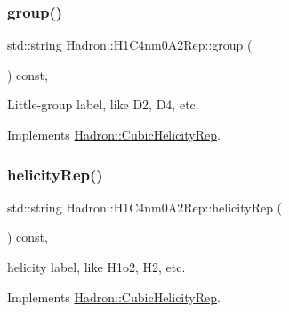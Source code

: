 \mbox{\label{structHadron_1_1H1C4nm0A2Rep_a3033103082fad0b1572469c929fde9bb}} 
\subsubsection{\texorpdfstring{group()}{group()}\hspace{0.1cm}{\footnotesize\ttfamily [5/5]}}
{\footnotesize\ttfamily std\+::string Hadron\+::\+H1\+C4nm0\+A2\+Rep\+::group (\begin{DoxyParamCaption}{ }\end{DoxyParamCaption}) const\hspace{0.3cm}{\ttfamily [inline]}, {\ttfamily [virtual]}}

Little-\/group label, like D2, D4, etc. 

Implements \mbox{\hyperlink{structHadron_1_1CubicHelicityRep_a101a7d76cd8ccdad0f272db44b766113}{Hadron\+::\+Cubic\+Helicity\+Rep}}.

\mbox{\label{structHadron_1_1H1C4nm0A2Rep_a4f5f743a470752f526a30b7db1ba0f21}} 
\subsubsection{\texorpdfstring{helicityRep()}{helicityRep()}\hspace{0.1cm}{\footnotesize\ttfamily [1/3]}}
{\footnotesize\ttfamily std\+::string Hadron\+::\+H1\+C4nm0\+A2\+Rep\+::helicity\+Rep (\begin{DoxyParamCaption}{ }\end{DoxyParamCaption}) const\hspace{0.3cm}{\ttfamily [inline]}, {\ttfamily [virtual]}}

helicity label, like H1o2, H2, etc. 

Implements \mbox{\hyperlink{structHadron_1_1CubicHelicityRep_af1096946b7470edf0a55451cc662f231}{Hadron\+::\+Cubic\+Helicity\+Rep}}.

\mbox{\label{structHadron_1_1H1C4nm0A2Rep_a4f5f743a470752f526a30b7db1ba0f21}} 
